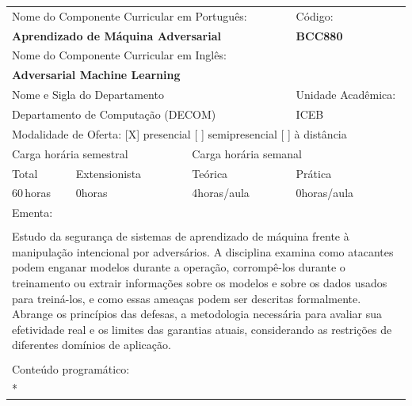 \documentclass[11pt]{article}
\begin{document}
\begin{center}
\begin{longtable}{|p{4cm}|p{4cm}|p{4cm}|p{4cm}|}
\hline
\multicolumn{3}{|p{12cm}|}{Nome do Componente Curricular em Português:} &
\multicolumn{1}{p{4cm}|}{Código:} \\ 
\multicolumn{3}{|p{12cm}|}{\textbf{Aprendizado de Máquina Adversarial}} &
\textbf{BCC880}\\ 
\multicolumn{3}{|p{12cm}|}{Nome do Componente Curricular em Inglês:} & \\ 
\multicolumn{3}{|p{12cm}|}{\textbf{Adversarial Machine Learning}} & \\ 
\hline
\multicolumn{3}{|p{12cm}|}{Nome e Sigla do Departamento} & Unidade Acadêmica: \\ 
\multicolumn{3}{|p{12cm}|}{Departamento de Computação (DECOM)} & {ICEB} \\ 
\hline
\multicolumn{4}{|p{16cm}|}{Modalidade de Oferta:
[X] presencial \hspace{0.6cm}
[ ] semipresencial \hspace{0.6cm}
[ ] à distância}\\
\hline
\multicolumn{2}{|p{8cm}|}{Carga horária semestral} &
\multicolumn{2}{p{8cm}|}{Carga horária semanal}\\
\hline
\multicolumn{1}{|p{4cm}|}{Total} &
\multicolumn{1}{p{4cm}|}{Extensionista} &
\multicolumn{1}{p{4cm}|}{Teórica} &
\multicolumn{1}{p{4cm}|}{Prática} \\ 
\multicolumn{1}{|p{4cm}|}{60\,horas} &
\multicolumn{1}{p{4cm}|}{0\;horas} &
\multicolumn{1}{p{4cm}|}{4\;horas/aula} &
\multicolumn{1}{p{4cm}|}{0\;horas/aula} \\ 
\hline
\multicolumn{4}{|p{16cm}|}{Ementa:}\\
\multicolumn{4}{|p{16cm}|}{}\\
\multicolumn{4}{|p{\dimexpr 16cm + 6\tabcolsep\relax}|}{Estudo da segurança de sistemas de aprendizado de máquina frente à manipulação intencional por adversários. A disciplina examina como atacantes podem enganar modelos durante a operação, corrompê-los durante o treinamento ou extrair informações sobre os modelos e sobre os dados usados para treiná-los, e como essas ameaças podem ser descritas formalmente. Abrange os princípios das defesas, a metodologia necessária para avaliar sua efetividade real e os limites das garantias atuais, considerando as restrições de diferentes domínios de aplicação.}\\
\multicolumn{4}{|p{16cm}|}{}\\
\hline
\multicolumn{4}{|p{16cm}|}{Conteúdo programático:}\\*

\end{longtable}
\end{center}
\end{document}

